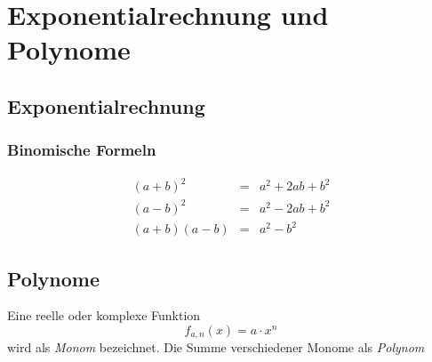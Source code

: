 

\chapter{Exponentialrechnung und Polynome}


\section{Exponentialrechnung}

\subsection{Binomische Formeln}

\begin{eqnarray}
(a+b)^2 &=& a^2 +2ab +b^2 \label{eq:binom1} \\
(a-b)^2 &=& a^2 -2ab +b^2 \label{eq:binom2} \\
(a+b)(a-b) &=& a^2 -b^2 \label{eq:binom3}
\end{eqnarray}


\section{Polynome}

\begin{definition}
Eine reelle oder komplexe Funktion
\[ f_{a,n}(x) = a\cdot x^n  \]
wird als \textsl{Monom} bezeichnet. Die Summe verschiedener Monome als \textsl{Polynom}
\end{definition}


